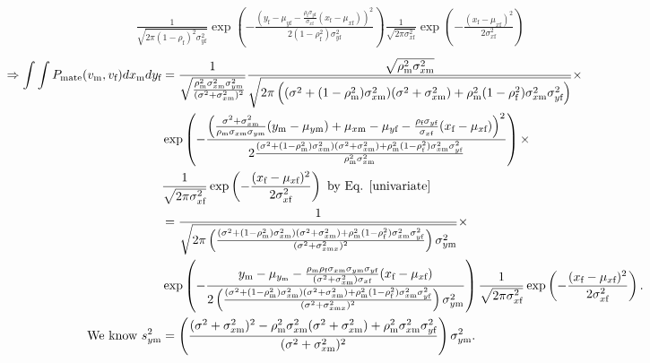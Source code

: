 \documentclass{article}
\newcommand{\x}[1]{\text{#1}}
\begin{document}
\begin{pf}
\begin{enumerate}
\begin{align*}
\\&\frac{1}{\sqrt{2\pi(1-\rho_\x{f})^2\sigma_{y\x{f}}^2}}\exp\left(-\frac{\left(y_\x{f}-\mu_{y\x{f}}-\frac{\rho_\x{f}\sigma_{y\x{f}}}{\sigma_{x\x{f}}}(x_\x{f}-\mu_{x\x{f}})\right)^2}{2(1-\rho_\x{f}^2)\sigma_{y\x{f}}^2}\right)\frac{1}{\sqrt{2\pi\sigma_{x\x{f}}^2}}\exp\left(-\frac{(x_\x{f}-\mu_{x\x{f}})^2}{2\sigma_{x\x{f}}^2}\right)
\end{align*}
\begin{align*}
\Rightarrow \int\int P_\text{mate}(v_\x{m},v_\x{f})dx_\x{m}dy_\x{f}&=\frac{1}{\sqrt{\frac{\rho_\x{m}^2\sigma_{x\x{m}}^2\sigma_{y\x{m}}^2}{(\sigma^2+\sigma_{x\x{m}}^2)^2}}}\frac{\sqrt{\rho_\x{m}^2\sigma_{x\x{m}}^2}}{\sqrt{2\pi\left((\sigma^2+(1-\rho_\x{m}^2)\sigma_{x\x{m}}^2)(\sigma^2+\sigma_{x\x{m}}^2)+\rho_\x{m}^2(1-\rho_\x{f}^2)\sigma_{x\x{m}}^2\sigma_{y\x{f}}^2\right)}}\times
\\&\exp\left(-\frac{\left(\frac{\sigma^2+\sigma_{x\x{m}}^2}{\rho_\x{m}\sigma_{x\x{m}}\sigma_{y\x{m}}}(y_\x{m}-\mu_{y\x{m}})+\mu_{x\x{m}}-\mu_{y\x{f}}-\frac{\rho_\x{f}\sigma_{y\x{f}}}{\sigma_{x\x{f}}}(x_\x{f}-\mu_{x\x{f}})\right)^2}{2\frac{(\sigma^2+(1-\rho_\x{m}^2)\sigma_{x\x{m}}^2)(\sigma^2+\sigma_{x\x{m}}^2)+\rho_\x{m}^2(1-\rho_\x{f}^2)\sigma_{x\x{m}}^2\sigma_{y\x{f}}^2}{\rho_{\x{m}}^2\sigma_{x\x{m}}^2}}\right)\times
\\&\frac{1}{\sqrt{2\pi\sigma_{x\x{f}}^2}}\exp\left(-\frac{(x_\x{f}-\mu_{x\x{f}})^2}{2\sigma_{x\x{f}}^2}\right) \text{ by Eq. \ref{univariate}}
\\&=\frac{1}{\sqrt{2\pi\left(\frac{(\sigma^2+(1-\rho_\x{m}^2)\sigma_{x\x{m}}^2)(\sigma^2+\sigma_{x\x{m}}^2)+\rho_\x{m}^2(1-\rho_\x{f}^2)\sigma_{x\x{m}}^2\sigma_{y\x{f}}^2}{(\sigma^2+\sigma_{x\x{m}x}^2)^2}\right)\sigma_{y\x{m}}^2}}\times
\\&\exp\left(-\frac{y_\x{m}-\mu_{y_\x{m}}-\frac{\rho_\x{m}\rho_\x{f}\sigma_{x\x{m}}\sigma_{y\x{m}}\sigma_{y\x{f}}}{(\sigma^2+\sigma_{x\x{m}}^2)\sigma_{x\x{f}}}(x_\x{f}-\mu_{x\x{f}})}{2\left(\frac{(\sigma^2+(1-\rho_\x{m}^2)\sigma_{x\x{m}}^2)(\sigma^2+\sigma_{x\x{m}}^2)+\rho_\x{m}^2(1-\rho_\x{f}^2)\sigma_{x\x{m}}^2\sigma_{y\x{f}}^2}{(\sigma^2+\sigma_{x\x{m}x}^2)^2}\right)\sigma_{y\x{m}}^2}\right)\frac{1}{\sqrt{2\pi\sigma_{x\x{f}}^2}}\exp\left(-\frac{(x_\x{f}-\mu_{x\x{f}})^2}{2\sigma_{x\x{f}}^2}\right).
\\\text{ We know } s_{y\x{m}}^2&=\left(\frac{(\sigma^2+\sigma_{x\x{m}}^2)^2-\rho_\x{m}^2\sigma_{x\x{m}}^2(\sigma^2+\sigma_{x\x{m}}^2)+\rho_\x{m}^2\sigma_{x\x{m}}^2\sigma_{y\x{f}}^2}{(\sigma^2+\sigma_{x\x{m}}^2)^2}\right)\sigma_{y\x{m}}^2.

\end{align*}
\end{enumerate}
\end{pf}
\end{document}
